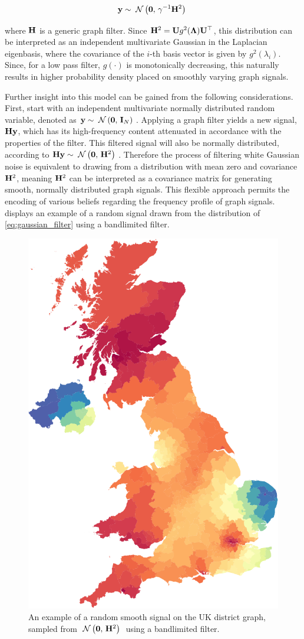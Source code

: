 \begin{equation}
    \label{eq:gaussian_filter}
    \mathbf{y} \sim \; \mathcal{N}\left(\mathbf{0}, \, \gamma^{-1} \mathbf{H}^2\right) \;
\end{equation}


where $\mathbf{H}$ is a generic graph filter. Since $\mathbf{H}^2 = \mathbf{U} g^2(\mathbf{\Lambda}) \mathbf{U}^\top$, this distribution can be interpreted as an independent multivariate Gaussian in the Laplacian eigenbasis, where the covariance of the $i$-th basis vector is given by $g^2(\lambda_i)$. Since, for a low pass filter, $g(\cdot)$ is monotonically decreasing, this naturally results in higher probability density placed on smoothly varying graph signals. 


Further insight into this model can be gained from the following considerations. First, start with an independent multivariate normally distributed random variable, denoted as $\mathbf{y} \sim \; \mathcal{N}\left(\mathbf{0}, \, \mathbf{I}_N\right) \;$. Applying a graph filter yields a new signal, $\mathbf{H} \mathbf{y}$, which has its high-frequency content attenuated in accordance with the properties of the filter. This filtered signal will also be normally distributed, according to $\mathbf{H} \mathbf{y} \sim \; \mathcal{N}\left(\mathbf{0}, \, \mathbf{H}^2\right) \;$. Therefore the process of filtering white Gaussian noise is equivalent to drawing from a distribution with mean zero and covariance $\mathbf{H}^2$, meaning $\mathbf{H}^2$ can be interpreted as a covariance matrix for generating smooth, normally distributed graph signals. This flexible approach permits the encoding of various beliefs regarding the frequency profile of graph signals.  displays an example of a random signal drawn from the distribution of \cref{eq:gaussian_filter} using a bandlimited filter.

    \begin{figure}[t]
        \vspace*{0.6cm}
	\centering
		\includegraphics[width=0.4\linewidth]{Figures/uk_smooth.pdf}
	\caption[An example of a random smooth graph signal]{An example of a random smooth signal on the UK district graph, sampled from $\; \mathcal{N}\left(\mathbf{0}, \, \mathbf{H}^2\right) \;$ using a bandlimited filter. }
	\label{fig:random_smooth_uk}
    \vspace*{0.6cm}
    \end{figure}

